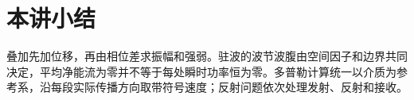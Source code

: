 \section{本讲小结}
叠加先加位移，再由相位差求振幅和强弱。驻波的波节波腹由空间因子和边界共同决定，平均净能流为零并不等于每处瞬时功率恒为零。多普勒计算统一以介质为参考系，沿每段实际传播方向取带符号速度；反射问题依次处理发射、反射和接收。
